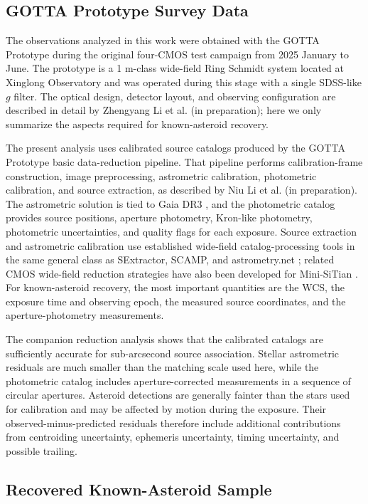 \documentclass[referee]{raa}
\begin{document}
\subsection{GOTTA Prototype Survey Data}

The observations analyzed in this work were obtained with the GOTTA Prototype during the original four-CMOS test campaign from 2025 January to June. The prototype is a 1 m-class wide-field Ring Schmidt system located at Xinglong Observatory and was operated during this stage with a single SDSS-like $g$ filter. The optical design, detector layout, and observing configuration are described in detail by Zhengyang Li et al. (in preparation); here we only summarize the aspects required for known-asteroid recovery.

The present analysis uses calibrated source catalogs produced by the GOTTA Prototype basic data-reduction pipeline. That pipeline performs calibration-frame construction, image preprocessing, astrometric calibration, photometric calibration, and source extraction, as described by Niu Li et al. (in preparation). The astrometric solution is tied to Gaia DR3 \citep{Gaia2023}, and the photometric catalog provides source positions, aperture photometry, Kron-like photometry, photometric uncertainties, and quality flags for each exposure. Source extraction and astrometric calibration use established wide-field catalog-processing tools in the same general class as SExtractor, SCAMP, and astrometry.net \citep{Bertin1996,Bertin2006,Lang2010}; related CMOS wide-field reduction strategies have also been developed for Mini-SiTian \citep{Xiao2025}. For known-asteroid recovery, the most important quantities are the WCS, the exposure time and observing epoch, the measured source coordinates, and the aperture-photometry measurements.

The companion reduction analysis shows that the calibrated catalogs are sufficiently accurate for sub-arcsecond source association. Stellar astrometric residuals are much smaller than the matching scale used here, while the photometric catalog includes aperture-corrected measurements in a sequence of circular apertures. Asteroid detections are generally fainter than the stars used for calibration and may be affected by motion during the exposure. Their observed-minus-predicted residuals therefore include additional contributions from centroiding uncertainty, ephemeris uncertainty, timing uncertainty, and possible trailing.

\subsection{Recovered Known-Asteroid Sample}
\end{document}
